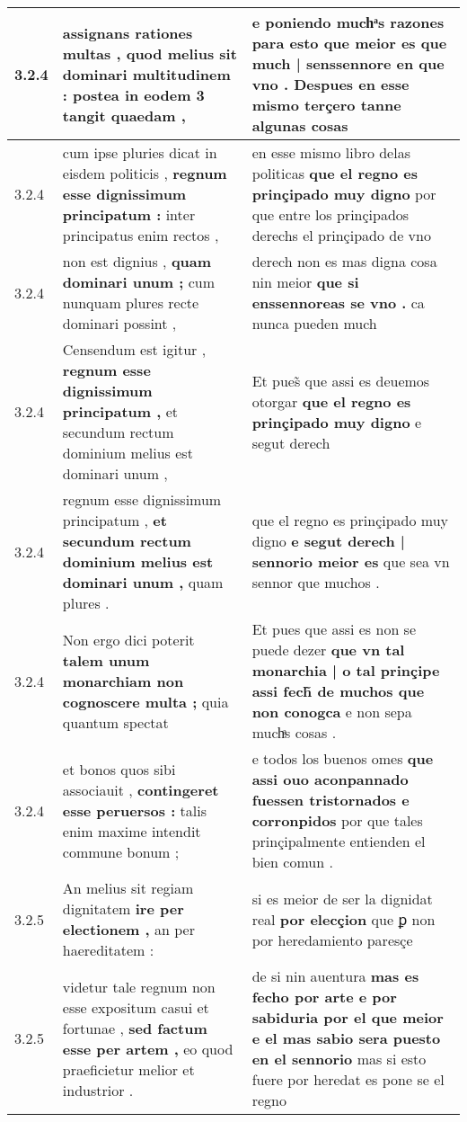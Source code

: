 \begin{tabular}{|p{1cm}|p{6.5cm}|p{6.5cm}|}
3.2.4 & assignans rationes multas , \textbf{ quod melius sit dominari multitudinem : } postea in eodem 3 tangit quaedam , & e poniendo muchͣs razones para esto \textbf{ que meior es que much | senssennore en que vno . } Despues en esse mismo terçero tanne algunas cosas \\\hline
3.2.4 & cum ipse pluries dicat in eisdem politicis , \textbf{ regnum esse dignissimum principatum : } inter principatus enim rectos , & en esse mismo libro delas politicas \textbf{ que el regno es prinçipado muy digno } por que entre los prinçipados derechs el prinçipado de vno \\\hline
3.2.4 & non est dignius , \textbf{ quam dominari unum ; } cum nunquam plures recte dominari possint , & derech non es mas digna cosa nin meior \textbf{ que si enssennoreas se vno . } ca nunca pueden much \\\hline
3.2.4 & Censendum est igitur , \textbf{ regnum esse dignissimum principatum , } et secundum rectum dominium melius est dominari unum , & Et pues̃ que assi es deuemos otorgar \textbf{ que el regno es prinçipado muy digno } e segut derech \\\hline
3.2.4 & regnum esse dignissimum principatum , \textbf{ et secundum rectum dominium melius est dominari unum , } quam plures . & que el regno es prinçipado muy digno \textbf{ e segut derech | sennorio meior es } que sea vn sennor que muchos . \\\hline
3.2.4 & Non ergo dici poterit \textbf{ talem unum monarchiam non cognoscere multa ; } quia quantum spectat & Et pues que assi es non se puede dezer \textbf{ que vn tal monarchia | o tal prinçipe assi fech̃ de muchos que non conogca } e non sepa muchͣs cosas . \\\hline
3.2.4 & et bonos quos sibi associauit , \textbf{ contingeret esse peruersos : } talis enim maxime intendit commune bonum ; & e todos los buenos omes \textbf{ que assi ouo aconpannado fuessen tristornados e corronpidos } por que tales prinçipalmente entienden el bien comun . \\\hline
3.2.5 & An melius sit regiam dignitatem \textbf{ ire per electionem , } an per haereditatem : & si es meior de ser la dignidat real \textbf{ por elecçion } que ꝑ non por heredamiento paresçe \\\hline
3.2.5 & videtur tale regnum non esse expositum casui et fortunae , \textbf{ sed factum esse per artem , } eo quod praeficietur melior et industrior . & de si nin auentura \textbf{ mas es fecho por arte e por sabiduria por el que meior e el mas sabio sera puesto en el sennorio } mas si esto fuere por heredat es pone se el regno \\\hline

\end{tabular}
